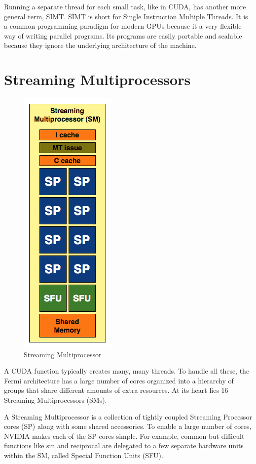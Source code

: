\documentclass[../main/report.tex]{subfiles}
\begin{document}
Running a separate thread for each small task, like in CUDA, has another more general term, SIMT.
SIMT is short for Single Instruction Multiple Threads.
It is a common programming paradigm for modern GPUs because it a very flexible way of writing parallel programs.
Its programs are easily portable and scalable because they ignore the underlying architecture of the machine.

\section{Streaming Multiprocessors}

\begin{figure}[htp]
\centering
\includegraphics[scale=0.40]{../introduction/assets/SM.png}
\caption{Streaming Multiprocessor}
\label{fig:sm}
\end{figure}

A CUDA function typically creates many, many threads.
To handle all these, the Fermi architecture has a large number of cores organized into a hierarchy of groups that share different amounts of extra resources.
At its heart lies 16 Streaming Multiprocessors (SMs).

A Streaming Multiprocessor is a collection of tightly coupled Streaming Processor cores (SP) along with some shared accessories.
To enable a large number of cores, NVIDIA makes each of the SP cores simple.
For example, common but difficult functions like sin and reciprocal are delegated to a few separate hardware units within the SM, called Special Function Units (SFU).
\end{document}
